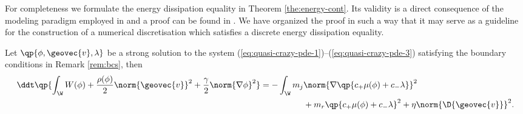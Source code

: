 \documentclass[final]{amsart}
\numberwithin{equation}{section}
\begin{document}
  {For completeness we formulate the energy dissipation equality in
    Theorem \ref{the:energy-cont}. Its validity is a direct
    consequence of the modeling paradigm employed in \cite{ADGK} and a
    proof can be found in \cite{pfmi}. We have organized the proof in
    such a way that it may serve as a guideline for the construction
    of a numerical discretisation which satisfies a discrete energy
    dissipation equality.}

\begin{The}
  \label{the:energy-cont}
  Let $\qp{\phi,{\geovec{v}},\lambda}$ be a strong solution to the system
  (\ref{eq:quasi-crazy-pde-1})--(\ref{eq:quasi-crazy-pde-3}) satisfying the boundary conditions in Remark \ref{rem:bcs}, then
  \begin{equation}
    \begin{split}
      \ddt 
      \qp{
        \int_\W
        W(\phi)
        +
        \frac{\rho(\phi)}{2} \norm{{\geovec{v}}}^2
        +
        \frac{\gamma}{2} \norm{\nabla \phi}^2 
        }
      =
      -
      \int_\W
      m_j
      &
      \norm{\nabla \qp{c_+ \mu(\phi) + c_- \lambda}}^2
      \\
      &+
      m_r 
      \qp{
        c_+ \mu(\phi) + c_- \lambda
      }^2
      +
      \eta\norm{\D {\geovec{v}}}^2.
    \end{split}
  \end{equation}
\end{The}
\end{document}
